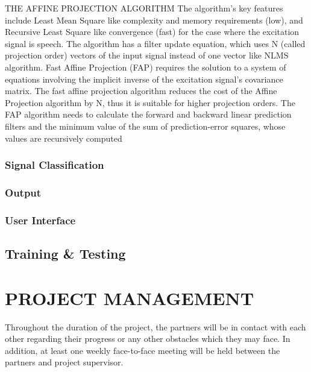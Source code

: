 \documentclass[10pt,twocolumn]{witseiepaper}
\begin{document}
THE AFFINE PROJECTION ALGORITHM
The algorithm’s key features include Least Mean Square like complexity and memory requirements (low), and Recursive Least Square like convergence (fast) for the case where the excitation signal is speech. The algorithm has a filter update equation, which uses N (called projection order) vectors of the input signal instead of one vector like NLMS algorithm. 
Fast Affine Projection (FAP) requires the solution to a system of equations involving the implicit inverse of the excitation signal’s covariance matrix. The fast affine projection algorithm reduces the cost of the Affine Projection algorithm by N, thus it is suitable for higher projection orders. The FAP algorithm needs to calculate the forward and backward linear prediction filters and the minimum value of the sum of prediction-error squares, whose values are recursively computed
\subsubsection{Signal Classification}



\subsubsection{Output}

\subsubsection{User Interface}

\subsection{Training \& Testing}



\section{PROJECT MANAGEMENT} %
Throughout the duration of the project, the partners will be in contact with each other regarding their progress or any other obstacles which they may face. In addition, at least one weekly face-to-face meeting will be held between the partners and project supervisor.
\end{document}
